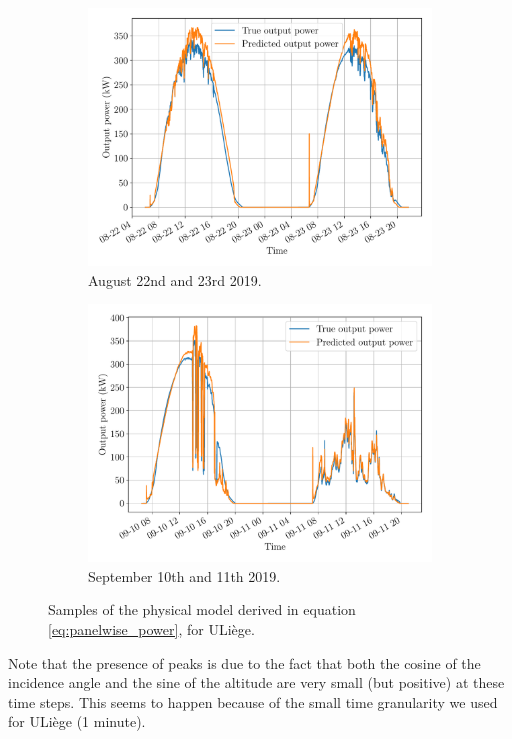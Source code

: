 \documentclass[a4paper, 12pt]{article}
\begin{document}
\begin{figure}[H]
	\centering
	\begin{subfigure}{0.48\textwidth}
		\centering
		\includegraphics[width=\textwidth]{resources/pdf/sart_tilman (22-08-2019).pdf}
		\vspace{-0.5em}
		\caption{August 22nd and 23rd 2019.}
		\label{fig:sart_tilman_1}
	\end{subfigure}
	\hspace{0.5em}
	\begin{subfigure}{0.48\textwidth}
		\centering
		\includegraphics[width=\textwidth]{resources/pdf/sart_tilman (10-09-2019).pdf}
		\vspace{-0.5em}
		\caption{September 10th and 11th 2019.}
		\label{fig:sart_tilman_2}
	\end{subfigure}
	\caption{Samples of the physical model derived in equation \ref{eq:panelwise_power}, for ULiège.}
	\label{fig:sart_tilman}
\end{figure}
Note that the presence of peaks is due to the fact that both the cosine of the incidence angle and the sine of the altitude are very small (but positive) at these time steps. This seems to happen because of the small time granularity we used for ULiège (1 minute).
\end{document}
